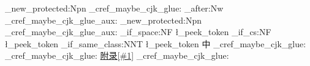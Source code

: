 \NewCommandCopy{\AlgebraOriginalCref}{\cref}
\NewCommandCopy{\AlgebraOriginalCrefCapital}{\Cref}
\ExplSyntaxOn
\cs_new_protected:Npn \algebra_cref_maybe_cjk_glue:
	{ \peek_after:Nw \algebra_cref_maybe_cjk_glue_aux: }
\cs_new_protected:Npn \algebra_cref_maybe_cjk_glue_aux:
	{
		\token_if_space:NF \l_peek_token
			{
				\token_if_cs:NF \l_peek_token
					{
						\xeCJK_if_same_class:NNT \l_peek_token 中
							{ \CJKecglue }
					}
			}
	}
	{
			{  }
			{  }
		\algebra_cref_maybe_cjk_glue:
	}
	{
			{  }
			{  }
		\algebra_cref_maybe_cjk_glue:
	}
	{
		\hyperref[#1]{附录\CJKecglue\ref*{#1}}
		\algebra_cref_maybe_cjk_glue:
	}
\ExplSyntaxOff

\newcommand{\MakeBookTitle}[1][封面]{%
	\bookmarksetup{startatroot}%
	\pdfbookmark[0]{#1}{AlgebraCover}%
	\begin{titlepage}
		\centering
		\vspace*{2.2cm}
		{\fontsize{36}{46}\selectfont\sffamily 代数学\par}
		\vspace{0.7cm}
		{\Large\sffamily\color{AlgebraGray}\BookVolumeName\par}
		\vspace{1.0cm}
		{\fontsize{24}{32}\selectfont\bfseries\color{AlgebraBlue}\BookTitle\par}
		\vfill
		{\large \BookAuthor\ 编写\par}
		\vspace{0.5cm}
		{\normalsize\BookDraftDate\par}
		\vspace*{1.8cm}
	\end{titlepage}
}

\newcommand{\MakeBookContents}{%
	\cleardoublepage
	\bookmarksetup{startatroot}%
	\pdfbookmark[0]{目录}{AlgebraContents}%
	\tableofcontents
}

